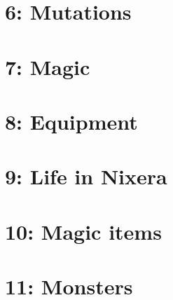 \documentclass[a4paper]{book}
\begin{document}
\section{6: Mutations}

\section{7: Magic}

\section{8: Equipment}

\section{9: Life in Nixera}

\section{10: Magic items}

\section{11: Monsters}
\end{document}
